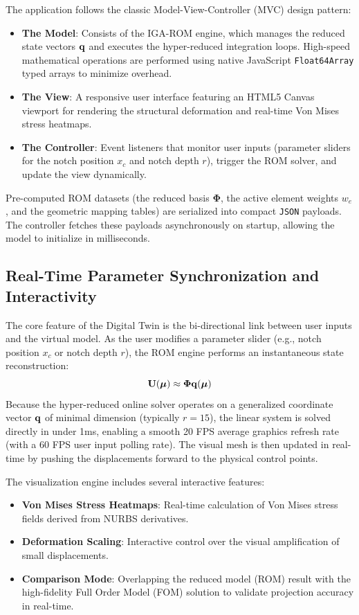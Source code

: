 The application follows the classic Model-View-Controller (MVC) design pattern:
\begin{itemize}
    \item \textbf{The Model}: Consists of the IGA-ROM engine, which manages the reduced state vectors $\mathbf{q}$ and executes the hyper-reduced integration loops. High-speed mathematical operations are performed using native JavaScript \texttt{Float64Array} typed arrays to minimize overhead.
    \item \textbf{The View}: A responsive user interface featuring an HTML5 Canvas viewport for rendering the structural deformation and real-time Von Mises stress heatmaps.
    \item \textbf{The Controller}: Event listeners that monitor user inputs (parameter sliders for the notch position $x_c$ and notch depth $r$), trigger the ROM solver, and update the view dynamically.
\end{itemize}

Pre-computed ROM datasets (the reduced basis $\boldsymbol{\Phi}$, the active element weights $w_e$, and the geometric mapping tables) are serialized into compact \texttt{JSON} payloads. The controller fetches these payloads asynchronously on startup, allowing the model to initialize in milliseconds.

\subsection{Real-Time Parameter Synchronization and Interactivity}
The core feature of the Digital Twin is the bi-directional link between user inputs and the virtual model. As the user modifies a parameter slider (e.g., notch position $x_c$ or notch depth $r$), the ROM engine performs an instantaneous state reconstruction:
\begin{equation}
    \mathbf{U}(\boldsymbol{\mu}) \approx \boldsymbol{\Phi} \mathbf{q}(\boldsymbol{\mu})
\end{equation}
Because the hyper-reduced online solver operates on a generalized coordinate vector $\mathbf{q}$ of minimal dimension (typically $r = 15$), the linear system is solved directly in under 1ms, enabling a smooth 20 FPS average graphics refresh rate (with a 60 FPS user input polling rate). The visual mesh is then updated in real-time by pushing the displacements forward to the physical control points.

The visualization engine includes several interactive features:
\begin{itemize}
    \item \textbf{Von Mises Stress Heatmaps}: Real-time calculation of Von Mises stress fields derived from NURBS derivatives.
    \item \textbf{Deformation Scaling}: Interactive control over the visual amplification of small displacements.
    \item \textbf{Comparison Mode}: Overlapping the reduced model (ROM) result with the high-fidelity Full Order Model (FOM) solution to validate projection accuracy in real-time.
\end{itemize}

